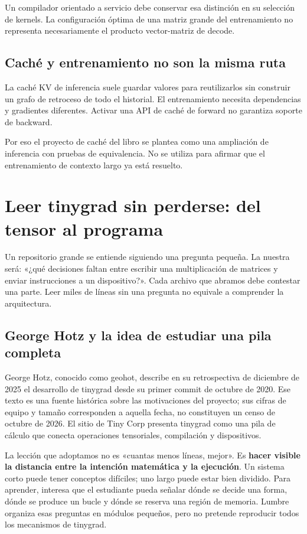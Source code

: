 \documentclass[12pt,a4paper,oneside]{report}
\begin{document}
Un compilador orientado a servicio debe conservar esa distinción en su selección de kernels. La configuración óptima de una matriz grande del entrenamiento no representa necesariamente el producto vector-matriz de decode.

\section{Caché y entrenamiento no son la misma ruta}
La caché KV de inferencia suele guardar valores para reutilizarlos sin construir un grafo de retroceso de todo el historial. El entrenamiento necesita dependencias y gradientes diferentes. Activar una API de caché de forward no garantiza soporte de backward.

Por eso el proyecto de caché del libro se plantea como una ampliación de inferencia con pruebas de equivalencia. No se utiliza para afirmar que el entrenamiento de contexto largo ya está resuelto.


\chapter{Leer tinygrad sin perderse: del tensor al programa}
\label{ch:atlas-tinygrad}
\begin{idea}
Un repositorio grande se entiende siguiendo una pregunta pequeña. La nuestra será: «¿qué decisiones faltan entre escribir una multiplicación de matrices y enviar instrucciones a un dispositivo?». Cada archivo que abramos debe contestar una parte. Leer miles de líneas sin una pregunta no equivale a comprender la arquitectura.

\end{idea}
\section{George Hotz y la idea de estudiar una pila completa}
George Hotz, conocido como geohot, describe en su retrospectiva de diciembre de 2025 el desarrollo de tinygrad desde su primer commit de octubre de 2020. Ese texto es una fuente histórica sobre las motivaciones del proyecto; sus cifras de equipo y tamaño corresponden a aquella fecha, no constituyen un censo de octubre de 2026. El sitio de Tiny Corp presenta tinygrad como una pila de cálculo que conecta operaciones tensoriales, compilación y dispositivos. \cite{geohot,tinygrad-site}

La lección que adoptamos no es «cuantas menos líneas, mejor». Es \textbf{hacer visible la distancia entre la intención matemática y la ejecución}. Un sistema corto puede tener conceptos difíciles; uno largo puede estar bien dividido. Para aprender, interesa que el estudiante pueda señalar dónde se decide una forma, dónde se produce un bucle y dónde se reserva una región de memoria. Lumbre organiza esas preguntas en módulos pequeños, pero no pretende reproducir todos los mecanismos de tinygrad.
\end{document}
